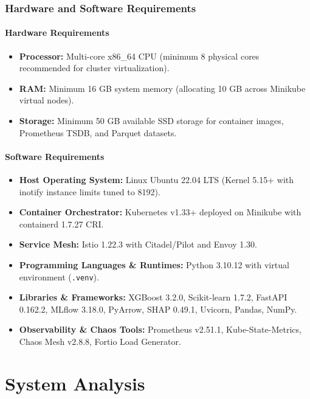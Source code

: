 \documentclass[12pt,a4paper]{report}
\begin{document}
\subsection{Hardware and Software Requirements}

\subsubsection*{Hardware Requirements}
\begin{itemize}
    \item \textbf{Processor:} Multi-core x86\_64 CPU (minimum 8 physical cores recommended for cluster virtualization).
    \item \textbf{RAM:} Minimum 16 GB system memory (allocating 10 GB across Minikube virtual nodes).
    \item \textbf{Storage:} Minimum 50 GB available SSD storage for container images, Prometheus TSDB, and Parquet datasets.
\end{itemize}

\subsubsection*{Software Requirements}
\begin{itemize}
    \item \textbf{Host Operating System:} Linux Ubuntu 22.04 LTS (Kernel 5.15+ with inotify instance limits tuned to 8192).
    \item \textbf{Container Orchestrator:} Kubernetes v1.33+ deployed on Minikube with containerd 1.7.27 CRI.
    \item \textbf{Service Mesh:} Istio 1.22.3 with Citadel/Pilot and Envoy 1.30.
    \item \textbf{Programming Languages \& Runtimes:} Python 3.10.12 with virtual environment (\texttt{.venv}).
    \item \textbf{Libraries \& Frameworks:} XGBoost 3.2.0, Scikit-learn 1.7.2, FastAPI 0.162.2, MLflow 3.18.0, PyArrow, SHAP 0.49.1, Uvicorn, Pandas, NumPy.
    \item \textbf{Observability \& Chaos Tools:} Prometheus v2.51.1, Kube-State-Metrics, Chaos Mesh v2.8.8, Fortio Load Generator.
\end{itemize}

\chapter{System Analysis}
\end{document}
